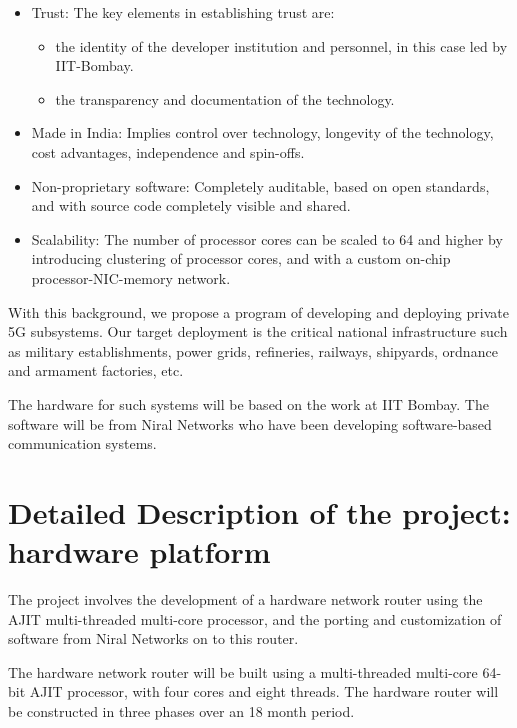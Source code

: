 \documentclass{article}
\begin{document}
	\begin{itemize}
	\item Trust:
		The key elements in establishing trust are: 
		\begin{itemize}
			\item the identity of the developer institution and personnel, in this case led
			by IIT-Bombay.

			\item the transparency and documentation of the technology.
		\end{itemize}
	\item Made in India:
		Implies control over technology, longevity of the technology,
		cost advantages, independence and spin-offs.

	\item Non-proprietary software:
		Completely auditable, based on open standards, and with source
		code completely visible and shared.

	\item Scalability:
		The number of processor cores can be scaled to 64 and higher
		by introducing clustering of processor cores, and with a
		custom on-chip processor-NIC-memory network.
	\end{itemize}

	With this background, we propose a program of developing and deploying  private 5G subsystems.
	Our target deployment is the critical national infrastructure such as military establishments, 
	power grids, refineries, railways, shipyards, ordnance and armament factories, etc. 

	The hardware for such systems will be based on the work at IIT Bombay. The software will be from 
	Niral Networks who have been developing software-based communication systems.


\section{Detailed Description of the project: hardware platform}

	The project involves the development of a hardware network router using the
	AJIT multi-threaded multi-core processor, and the porting and customization of
	software from Niral Networks on to this router. 

	The hardware network router will be built using a multi-threaded multi-core
	64-bit AJIT processor, with four cores and eight threads.  The hardware
	router will be constructed in three phases over an 18 month period.
\end{document}
